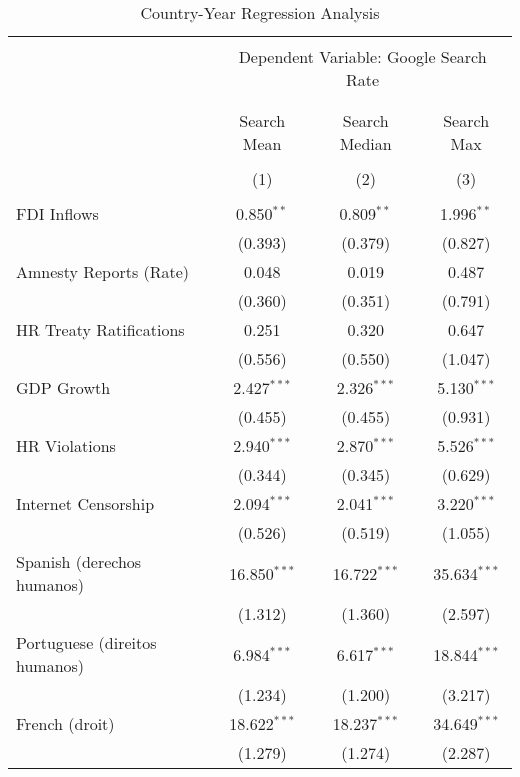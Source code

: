 
\begin{table}[!htbp] \centering 
  \caption{Country-Year Regression Analysis} 
  \label{} 
\begin{tabular}{@{\extracolsep{5pt}}lccc} 
\\[-1.8ex]\hline 
\hline \\[-1.8ex] 
 & \multicolumn{3}{c}{Dependent Variable: Google Search Rate} \\ 
\cline{2-4} 
\\[-1.8ex] & \multicolumn{3}{c}{ } \\ 
 & Search Mean & Search Median & Search Max \\ 
\\[-1.8ex] & (1) & (2) & (3)\\ 
\hline \\[-1.8ex] 
 FDI Inflows & 0.850$^{**}$ & 0.809$^{**}$ & 1.996$^{**}$ \\ 
  & (0.393) & (0.379) & (0.827) \\ 
  Amnesty Reports (Rate) & 0.048 & 0.019 & 0.487 \\ 
  & (0.360) & (0.351) & (0.791) \\ 
  HR Treaty Ratifications & 0.251 & 0.320 & 0.647 \\ 
  & (0.556) & (0.550) & (1.047) \\ 
  GDP Growth & 2.427$^{***}$ & 2.326$^{***}$ & 5.130$^{***}$ \\ 
  & (0.455) & (0.455) & (0.931) \\ 
  HR Violations & 2.940$^{***}$ & 2.870$^{***}$ & 5.526$^{***}$ \\ 
  & (0.344) & (0.345) & (0.629) \\ 
  Internet Censorship & 2.094$^{***}$ & 2.041$^{***}$ & 3.220$^{***}$ \\ 
  & (0.526) & (0.519) & (1.055) \\ 
  Spanish (derechos humanos) & 16.850$^{***}$ & 16.722$^{***}$ & 35.634$^{***}$ \\ 
  & (1.312) & (1.360) & (2.597) \\ 
  Portuguese (direitos humanos) & 6.984$^{***}$ & 6.617$^{***}$ & 18.844$^{***}$ \\ 
  & (1.234) & (1.200) & (3.217) \\ 
  French (droit) & 18.622$^{***}$ & 18.237$^{***}$ & 34.649$^{***}$ \\ 
  & (1.279) & (1.274) & (2.287) \\ 

\end{tabular}
\end{table}
